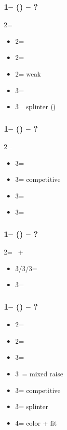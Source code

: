 \documentclass[12pt, a4paper]{report}
\begin{document}
{{{            \subsubsection*{1\diams -- (\alrts{2\diams}) -- ?}
            2\diams = \major
            \begin{itemize}
                \item 2\hearts = \clubs\ \invp
                \item 2\spades = \diams\ \invp
                \item 2\nt = \minor weak
                \item 3\minor = \nat\ \nf
                \item 3\major = splinter (\fton{4\diams})
            \end{itemize}

            \subsubsection*{1\diams -- (\alrts{2\nt}) -- ?}
            2\nt = \twosuit{\clubs}{\hearts}
            \begin{itemize}
                \item 3\clubs = \diams\ \invp
                \item 3\diams = competitive
                \item 3\hearts = \spades\ \invp
                \item 3\spades = \nat\ \nf
            \end{itemize}

            \subsubsection*{1\diams -- (\alrts{2\nt}) -- ?}
            2\nt = \clubs\ + \major
            \begin{itemize}
                \item 3\clubs/3\diams/3\hearts = \trsf{\diams/\hearts/\spades} \invp
                \item 3\spades = \gf
            \end{itemize}

            \subsubsection*{1\hearts -- (\alrts{2\hearts}) -- ?}
            \begin{itemize}
                \item 2\spades = \hearts\ \invp
                \item 2\nt = \clubs\ \invp
                \item 3\clubs = \diams\ \invp
                \item 3\diams\ = mixed raise
                \item 3\hearts = competitive
                \item 3\spades = splinter
                \item 4\minor = color + fit
            \end{itemize}

}}}
\end{document}
